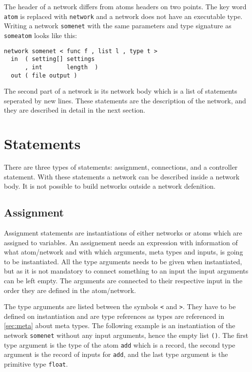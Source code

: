The header of a network differs from atoms headers on two points. The
key word \verb#atom# is replaced with \verb#network# and a network
does not have an executable type. Writing a network \verb#somenet#
with the same parameters and type signature as \verb#someatom# looks
like this:

\begin{verbatim}
network somenet < func f , list l , type t >
  in  ( setting[] settings
      , int       length  )
  out ( file output )
\end{verbatim}

The second part of a network is its network body which is a list of
statements seperated by new lines. These statements are the
description of the network, and they are described in detail in the
next section.

\section{Statements} \label{sec:stmt}
There are three types of statements: assignment, connections, and a
controller statement. With these statements a network can be described
inside a network body. It is not possible to build networks outside a
network defenition.

\subsection{Assignment}
Assignment statements are instantiations of either networks or atoms
which are assigned to variables. An assignement needs an expression
with information of what atom/network and with which arguments, meta
types and inputs, is going to be instantiated. All the type arguments
needs to be given when instantiated, but as it is not mandatory to
connect something to an input the input arguments can be left
empty. The arguments are connected to their respective input in the
order they are defined in the atom/network.

The type arguments are listed between the symbols \verb#<# and
\verb#>#. They have to be defined on instantiation and are type
references as types are referenced in \autoref{sec:meta} about
meta types. The following example is an instantiation of the network
\verb#somenet# without any input arguments, hence the empty list
\verb#()#. The first type argument is the type of the atom \verb#add#
which is a record, the second type argument is the record of inputs
for \verb#add#, and the last type argument is the primitive type
\verb#float#.


